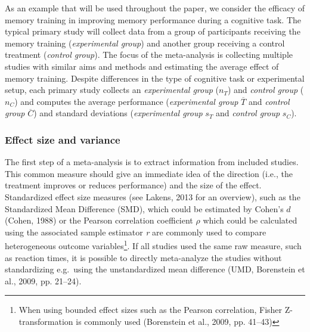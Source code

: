 \documentclass[
  man,floatsintext]{apa6}
\begin{document}
As an example that will be used throughout the paper, we consider the efficacy of memory training in improving memory performance during a cognitive task. The typical primary study will collect data from a group of participants receiving the memory training (\emph{experimental group}) and another group receiving a control treatment (\emph{control group}). The focus of the meta-analysis is collecting multiple studies with similar aims and methods and estimating the average effect of memory training. Despite differences in the type of cognitive task or experimental setup, each primary study collects an \emph{experimental group} (\(n_{T}\)) and \emph{control group} (\(n_{C}\)) and computes the average performance (\emph{experimental group} \(\overline T\) and \emph{control group} \(\overline C\)) and standard deviations (\emph{experimental group} \(s_{T}\) and \emph{control group}
\(s_{C}\)).

\hypertarget{effect-size-and-variance}{%
\subsubsection{Effect size and variance}\label{effect-size-and-variance}}

The first step of a meta-analysis is to extract information from included studies. This common measure should give an immediate idea of the direction (i.e., the treatment improves or reduces performance) and the size of the effect. Standardized effect size measures (see Lakens, 2013 for an overview), such as the Standardized Mean Difference (SMD), which could be estimated by Cohen's \(d\) (Cohen, 1988) or the Pearson correlation coefficient \(\rho\) which could be calculated using the associated sample estimator \emph{r} are commonly used to compare heterogeneous outcome variables\footnote{ When using bounded effect sizes such as the Pearson correlation, Fisher Z-transformation is commonly used (Borenstein et al., 2009, pp. 41--43)}. If all studies used the same raw measure, such as reaction times, it is possible to directly meta-analyze the studies without standardizing e.g.~using the unstandardized mean difference (UMD, Borenstein et al., 2009, pp. 21--24).
\end{document}
